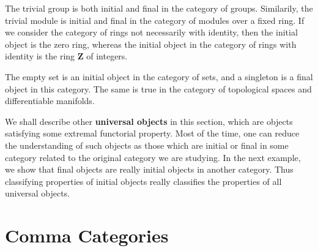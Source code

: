 \begin{example}
    The trivial group is both initial and final in the category of groups. Similarily, the trivial module is initial and final in the category of modules over a fixed ring. If we consider the category of rings not necessarily with identity, then the initial object is the zero ring, whereas the initial object in the category of rings with identity is the ring $\mathbf{Z}$ of integers.
\end{example}

\begin{example}
    The empty set is an initial object in the category of sets, and a singleton is a final object in this category. The same is true in the category of topological spaces and differentiable manifolds.
\end{example}

We shall describe other {\bf universal objects} in this section, which are objects satisfying some extremal functorial property. Most of the time, one can reduce the understanding of such objects as those which are initial or final in some category related to the original category we are studying. In the next example, we show that final objects are really initial objects in another category. Thus classifying properties of initial objects really classifies the properties of all universal objects.

\section{Comma Categories}


